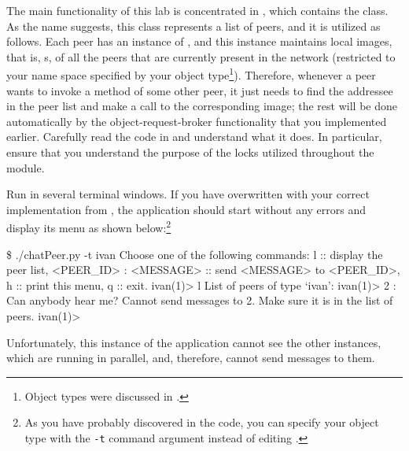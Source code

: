 \documentclass[a4paper]{article}
\begin{document}
The main functionality of this lab is concentrated in ,
which contains the  class. As the name suggests, this class
represents a list of peers, and it is utilized as follows. Each peer has an
instance of , and this instance maintains local images, that
is, s, of all the peers that are currently present in the
network (restricted to your name space specified by your object
type\footnote{Object types were discussed in .}). Therefore, whenever a
peer wants to invoke a method of some other peer, it just needs to find the
addressee in the peer list and make a call to the corresponding image; the rest
will be done automatically by the object-request-broker functionality that you
implemented earlier. Carefully read the code in  and
understand what it does. In particular, ensure that you understand the purpose
of the locks utilized throughout the module.

Run  in several terminal windows. If you have overwritten
 with your correct implementation from , the
application should start without any errors and display its menu as shown
below:\footnote{As you have probably discovered in the code, you can specify
your object type with the \texttt{-t} command argument instead of editing
.}
\begin{shell}
\$ ./chatPeer.py -t ivan
Choose one of the following commands:
    l                       ::  display the peer list,
    <PEER_ID> : <MESSAGE>   ::  send <MESSAGE> to <PEER_ID>,
    h                       ::  print this menu,
    q                       ::  exit.
ivan(1)> l
List of peers of type `ivan':
ivan(1)> 2 : Can anybody hear me?
Cannot send messages to 2. Make sure it is in the list of peers.
ivan(1)>
\end{shell}
Unfortunately, this instance of the application cannot see the other instances,
which are running in parallel, and, therefore, cannot send messages to them.
\end{document}
